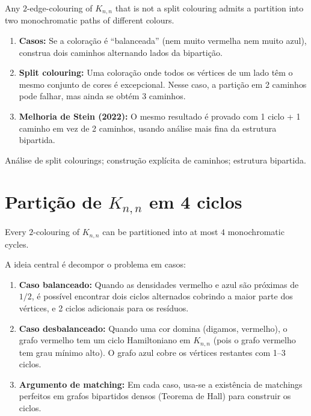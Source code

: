\documentclass[12pt,a4paper,twoside,openright]{book}
\theoremstyle{definition}
\newcommand{\arxiv}[1]{\href{https://arxiv.org/abs/#1}{\textcolor{linkcolor}{arXiv:#1}}}
\begin{document}
\begin{theorem}[Pokrovskiy, 2014]
Any $2$-edge-colouring of $K_{n,n}$ that is not a split colouring admits a partition into
two monochromatic paths of different colours.
\end{theorem}

\begin{proofsketch}
\begin{enumerate}[leftmargin=*]
  \item \textbf{Casos:} Se a coloração é ``balanceada'' (nem muito vermelha nem muito azul),
        construa dois caminhos alternando lados da bipartição.

  \item \textbf{Split colouring:} Uma coloração onde todos os vértices de um lado têm o mesmo conjunto
        de cores é excepcional. Nesse caso, a partição em 2 caminhos pode falhar,
        mas ainda se obtém 3 caminhos.

  \item \textbf{Melhoria de Stein (2022):} O mesmo resultado é provado com 1 ciclo + 1 caminho em vez de 2 caminhos,
        usando análise mais fina da estrutura bipartida.
\end{enumerate}
\end{proofsketch}

\begin{techniques}
Análise de split colourings; construção explícita de caminhos; estrutura bipartida.
\end{techniques}

\section{Partição de $K_{n,n}$ em 4 ciclos}

\begin{theorem}[2024 — \arxiv{2409.03394}]
Every $2$-colouring of $K_{n,n}$ can be partitioned into at most $4$ monochromatic cycles.
\end{theorem}

\begin{proofsketch}
A ideia central é decompor o problema em casos:
\begin{enumerate}[leftmargin=*]
  \item \textbf{Caso balanceado:} Quando as densidades vermelho e azul são próximas de $1/2$,
        é possível encontrar dois ciclos alternados cobrindo a maior parte dos vértices,
        e 2 ciclos adicionais para os resíduos.

  \item \textbf{Caso desbalanceado:} Quando uma cor domina (digamos, vermelho),
        o grafo vermelho tem um ciclo Hamiltoniano em $K_{n,n}$ (pois o grafo vermelho tem grau mínimo alto).
        O grafo azul cobre os vértices restantes com 1--3 ciclos.

  \item \textbf{Argumento de matching:} Em cada caso, usa-se a existência de matchings perfeitos
        em grafos bipartidos densos (Teorema de Hall) para construir os ciclos.
\end{enumerate}
\end{proofsketch}
\end{document}
